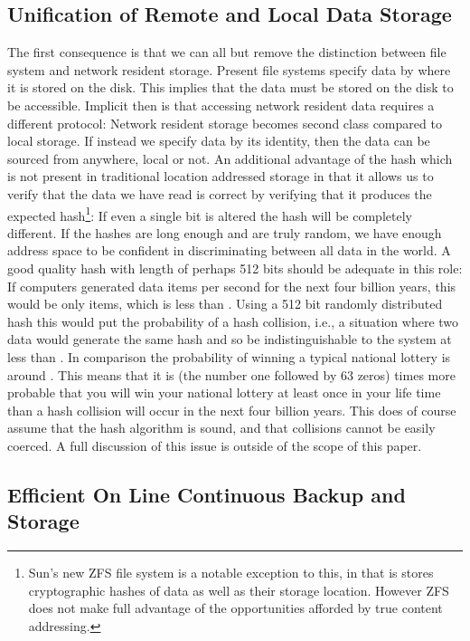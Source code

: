 \documentclass[british,english]{article}
\begin{document}
\subsection{Unification of Remote and Local Data Storage}

The first consequence is that we can all but remove the distinction
between file system and network resident storage. Present file systems
specify data by where it is stored on the disk. This implies that
the data must be stored on the disk to be accessible. Implicit then
is that accessing network resident data requires a different protocol:
Network resident storage becomes second class compared to local storage.
If instead we specify data by its identity, then the data can be sourced
from anywhere, local or not. An additional advantage of the hash which
is not present in traditional location addressed storage in that it
allows us to verify that the data we have read is correct by verifying
that it produces the expected hash\footnote{Sun's new ZFS file system is a notable exception to this, in that
is stores cryptographic hashes of data as well as their storage location.
However ZFS does not make full advantage of the opportunities afforded
by true content addressing.}: If even a single bit is altered the hash will be completely different.
If the hashes are long enough and are truly random, we have enough
address space to be confident in discriminating between all data in
the world. A good quality hash with length of perhaps 512 bits should
be adequate in this role: If  computers generated 
data items per second for the next four billion years, this would
be only 
items, which is less than . Using a 512 bit randomly distributed
hash this would put the probability of a hash collision, i.e., a situation
where two data would generate the same hash and so be indistinguishable
to the system at less than . In comparison the probability
of winning a typical national lottery is around . This means
that it is  (the number one followed by 63 zeros) times
more probable that you will win your national lottery at least once
in your life time than a hash collision will occur in the next four
billion years. This does of course assume that the hash algorithm
is sound, and that collisions cannot be easily coerced. A full discussion
of this issue is outside of the scope of this paper.


\subsection{Efficient On Line Continuous Backup and Storage}
\end{document}
